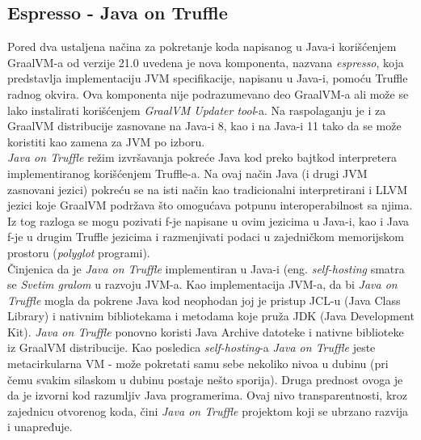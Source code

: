 \documentclass[a4paper]{article}
\begin{document}
\subsection{Espresso - Java on Truffle}
\label{sub:Espresso - Java on Truffle}

Pored dva ustaljena načina za pokretanje koda napisanog u Java-i korišćenjem GraalVM-a od verzije 21.0 uvedena je nova komponenta, nazvana \emph{espresso}, koja predstavlja implementaciju JVM specifikacije, napisanu u Java-i, pomoću Truffle radnog okvira. Ova komponenta nije podrazumevano deo GraalVM-a ali može se lako instalirati korišćenjem \emph{GraalVM Updater tool}-a. Na raspolaganju je i za GraalVM distribucije zasnovane na Java-i 8, kao i na Java-i 11 tako da se može koristiti kao zamena za JVM po izboru. \\


\emph{Java on Truffle} režim izvršavanja pokreće Java kod preko bajtkod interpretera implementiranog korišćenjem Truffle-a. Na ovaj način Java (i drugi JVM zasnovani jezici) pokreću se na isti način kao tradicionalni interpretirani i LLVM jezici koje GraalVM podržava što omogućava potpunu interoperabilnost sa njima. Iz tog razloga se mogu pozivati f-je napisane u ovim jezicima u Java-i, kao i Java f-je u drugim Truffle jezicima i razmenjivati podaci u zajedničkom memorijskom prostoru (\emph{polyglot} programi). \\

Činjenica da je \emph{Java on Truffle} implementiran u Java-i (eng. \emph{self-hosting} smatra se \emph{Svetim gralom} u razvoju JVM-a. Kao implementacija JVM-a, da bi \emph{Java on Truffle} mogla da pokrene Java kod neophodan joj je pristup JCL-u (Java Class Library) i nativnim bibliotekama i metodama koje pruža JDK (Java Development Kit). \emph{Java on Truffle} ponovno koristi Java Archive datoteke i nativne biblioteke iz GraalVM distribucije. Kao posledica \emph{self-hosting}-a \emph{Java on Truffle} jeste metacirkularna VM - može pokretati samu sebe nekoliko nivoa u dubinu (pri čemu svakim silaskom u dubinu postaje nešto sporija). Druga prednost ovoga je da je izvorni kod razumljiv Java programerima. Ovaj nivo transparentnosti, kroz zajednicu otvorenog koda, čini \emph{Java on Truffle} projektom koji se ubrzano razvija i unapređuje.
\end{document}
